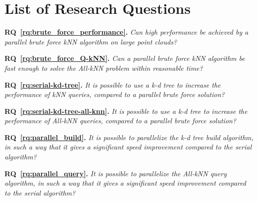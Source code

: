 
\tableofcontents
{}
\clearpage

\listoftables
{}
\clearpage

\listoffigures
{}
\clearpage

\listofalgorithms
{}
\clearpage

\chapter*{List of Research Questions} %
\label{sec:section_name}


\textbf{RQ~\ref{rq:brute_force_performance}.} \emph{Can high performance be achieved by a parallel brute force kNN algorithm on large point clouds?}

\textbf{RQ~\ref{rq:brute_force_Q-kNN}.} \emph{Can a parallel brute force kNN algorithm be fast enough to solve the All-kNN problem within reasonable time?}

\textbf{RQ~\ref{rq:serial-kd-tree}.} \emph{It is possible to use a k-d tree to increase the performance of kNN queries, compared to a parallel brute force solution?}

\textbf{RQ~\ref{rq:serial-kd-tree-all-knn}.} \emph{It is possible to use a k-d tree to increase the performance of All-kNN queries, compared to a parallel brute force solution?}

\textbf{RQ~\ref{rq:parallel_build}.} \emph{It is possible to parallelize the k-d tree build algorithm, in such a way that it gives a significant speed improvement compared to the serial algorithm?}

\textbf{RQ~\ref{rq:parallel_query}.} \emph{It is possible to parallelize the All-kNN query algorithm, in such a way that it gives a significant speed improvement compared to the serial algorithm?}

\clearpage
